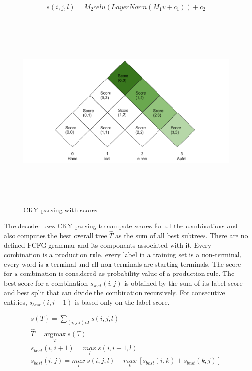 \documentclass[a4paper, 11pt]{article}
\begin{document}
\begin{align*}
s(i,j,l) = M_2relu(LayerNorm(M_1v + c_1)) + c_2
\end{align*}

\begin{figure}[H]
    \centering
    \includegraphics[width=\textwidth,height=10cm,keepaspectratio=true]
    {cky-parsing-chart-3.png}
    \caption{
        CKY parsing with scores
    }
    \label{fig:CKY}
\end{figure}

The decoder uses CKY parsing to compute scores for all the combinations and also computes the best overall tree $\hat{T}$ as the sum of all best subtrees. There are no defined PCFG grammar and its components associated with it. Every combination is a production rule, every label in a training set is a non-terminal, every word is a terminal and all non-terminals are starting terminals. The score for a combination is considered as probability value of a production rule. The best score for a combination $s_{best}(i,j)$ is obtained by the sum of its label score and best split that can divide the combination recursively. For consecutive entities, $s_{best}(i,i+1)$ is based only on the label score.

\begin{align*}
s(T) = \sum_{(i,j,l) \epsilon T}s(i,j,l) \\
\hat{T} = \underset{T}{\mathrm{argmax}}\ s(T) \\
s_{best}(i,i+1) = \underset{l}{max}\ s(i,i+1,l) \\
s_{best}(i,j) = \underset{l}{max}\ s(i,j,l) + \underset{k}{max}\ {\left[s_{best}(i,k) + s_{best}(k,j)\right]}
\end{align*}
\end{document}
